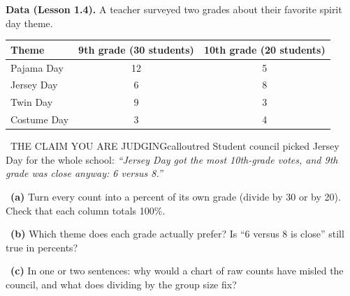 \newpage
{}


\textbf{Data (Lesson 1.4).} A teacher surveyed two grades about their favorite spirit day theme.

\begin{center}
\begin{tabular}{|l|c|c|}\hline
\textbf{Theme} & \textbf{9th grade (30 students)} & \textbf{10th grade (20 students)} \\ \hline
Pajama Day & 12 & 5 \\ \hline
Jersey Day & 6 & 8 \\ \hline
Twin Day & 9 & 3 \\ \hline
Costume Day & 3 & 4 \\ \hline
\end{tabular}
\end{center}

\begin{callout}{\IconWarn\ THE CLAIM YOU ARE JUDGING}{calloutred}
Student council picked Jersey Day for the whole school: \emph{``Jersey Day got the most 10th-grade votes, and 9th grade was close anyway: 6 versus 8.''}
\end{callout}

~\textbf{(a)} Turn every count into a percent of its own grade (divide by 30 or by 20). Check that each column totals 100\%.
\workspace{0.95in}

~\textbf{(b)} Which theme does each grade actually prefer? Is ``6 versus 8 is close'' still true in percents?
\workspace{1.35in}

~\textbf{(c)} In one or two sentences: why would a chart of raw counts have misled the council, and what does dividing by the group size fix?
\workspace{0.75in}

